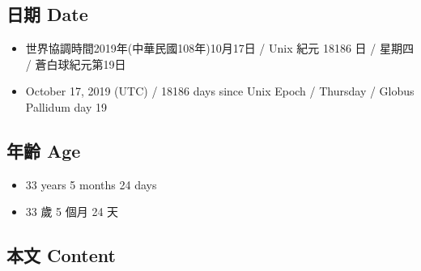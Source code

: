 \documentclass[
]{article}
\providecommand{\tightlist}{%
  \setlength{\itemsep}{0pt}\setlength{\parskip}{0pt}}
\begin{document}
\hypertarget{ux65e5ux671f-date-18}{%
\subsection{日期 Date}\label{ux65e5ux671f-date-18}}

\begin{itemize}
\tightlist
\item
  世界協調時間2019年(中華民國108年)10月17日 / Unix 紀元 18186 日 /
  星期四 / 蒼白球紀元第19日
\item
  October 17, 2019 (UTC) / 18186 days since Unix Epoch / Thursday /
  Globus Pallidum day 19
\end{itemize}

\hypertarget{ux5e74ux9f61-age-18}{%
\subsection{年齡 Age}\label{ux5e74ux9f61-age-18}}

\begin{itemize}
\tightlist
\item
  33 years 5 months 24 days
\item
  33 歲 5 個月 24 天
\end{itemize}

\hypertarget{ux672cux6587-content-18}{%
\subsection{本文 Content}\label{ux672cux6587-content-18}}
\end{document}
